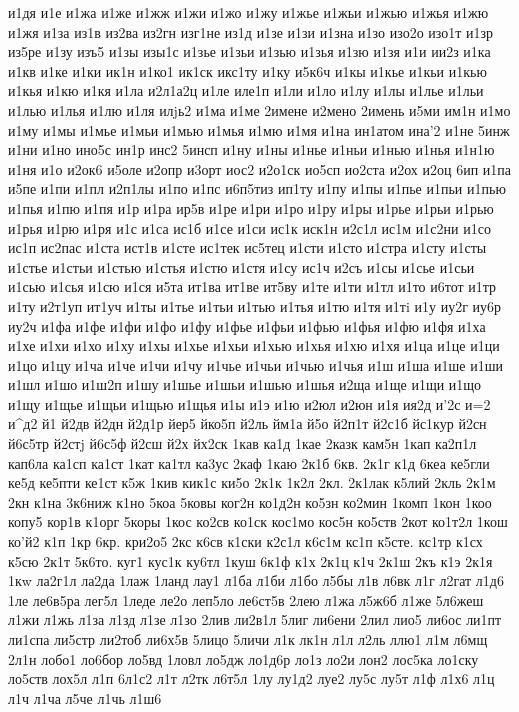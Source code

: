 {{и1дя
и1е
и1жа
и1же
и1жж
и1жи
и1жо
и1жу
и1жье
и1жьи
и1жью
и1жья
и1жю
и1жя
и1за
из1в
из2ва
из2гн
изг1не
из1д
и1зе
и1зи
и1зна
и1зо
изо2о
изо1т
и1зр
из5ре
и1зу
изъ5
и1зы
изы1с
и1зье
и1зьи
и1зью
и1зья
и1зю
и1зя
и1и
ии2з
и1ка
и1кв
и1ке
и1ки
ик1н
и1ко1
ик1ск
икс1ту
и1ку
и5к6ч
и1кы
и1кье
и1кьи
и1кью
и1кья
и1кю
и1кя
и1ла
и2л1а2ц
и1ле
иле1п
и1ли
и1ло
и1лу
и1лы
и1лье
и1льи
и1лью
и1лья
и1лю
и1ля
илjь2
и1ма
и1ме
2имене
и2мено
2имень
и5ми
им1н
и1мо
и1му
и1мы
и1мье
и1мьи
и1мью
и1мья
и1мю
и1мя
и1на
ин1атом
ина'2
и1не
5инж
и1ни
и1но
ино5с
ин1р
инс2
5инсп
и1ну
и1ны
и1нье
и1ньи
и1нью
и1нья
и1н1ю
и1ня
и1о
и2ок6
и5оле
и2опр
и3орт
иос2
и2о1ск
ио5сп
ио2ста
и2ох
и2оц
6ип
и1па
и5пе
и1пи
и1пл
и2п1лы
и1по
и1пс
и6п5тиз
ип1ту
и1пу
и1пы
и1пье
и1пьи
и1пью
и1пья
и1пю
и1пя
и1р
и1ра
ир5в
и1ре
и1ри
и1ро
и1ру
и1ры
и1рье
и1рьи
и1рью
и1рья
и1рю
и1ря
и1с
и1са
ис1б
и1се
и1си
ис1к
иск1н
и2с1л
ис1м
и1с2ни
и1со
ис1п
ис2пас
и1ста
ист1в
и1сте
ис1тек
ис5тец
и1сти
и1сто
и1стра
и1сту
и1сты
и1стье
и1стьи
и1стью
и1стья
и1стю
и1стя
и1су
ис1ч
и2съ
и1сы
и1сье
и1сьи
и1сью
и1сья
и1сю
и1ся
и5та
ит1ва
ит1ве
ит5ву
и1те
и1ти
и1тл
и1то
и6тот
и1тр
и1ту
и2т1уп
ит1уч
и1ты
и1тье
и1тьи
и1тью
и1тья
и1тю
и1тя
и1тi
и1у
иу2г
иу6р
иу2ч
и1фа
и1фе
и1фи
и1фо
и1фу
и1фье
и1фьи
и1фью
и1фья
и1фю
и1фя
и1ха
и1хе
и1хи
и1хо
и1ху
и1хы
и1хье
и1хьи
и1хью
и1хья
и1хю
и1хя
и1ца
и1це
и1ци
и1цо
и1цу
и1ча
и1че
и1чи
и1чу
и1чье
и1чьи
и1чью
и1чья
и1ш
и1ша
и1ше
и1ши
и1шл
и1шо
и1ш2п
и1шу
и1шье
и1шьи
и1шью
и1шья
и2ща
и1ще
и1щи
и1що
и1щу
и1щье
и1щьи
и1щью
и1щья
и1ы
и1э
и1ю
и2юл
и2юн
и1я
ия2д
и'2с
и=2
и^д2
й1
й2дв
й2дн
й2д1р
йер5
йко5п
й2ль
йм1а
й5о
й2п1т
й2с1б
йс1кур
й2сн
й6с5тр
й2стj
й6с5ф
й2сш
й2х
йх2ск
1кав
ка1д
1кае
2казк
кам5н
1кап
ка2п1л
кап6ла
ка1сп
ка1ст
1кат
ка1тл
ка3ус
2каф
1каю
2к1б
6кв.
2к1г
к1д
6кеа
ке5гли
ке5д
ке5пти
ке1ст
к5ж
1кив
кик1с
ки5о
2к1к
1к2л
2кл.
2к1лак
к5лий
2кль
2к1м
2кн
к1на
3к6ниж
к1но
5коа
5ковы
ког2н
ко1д2н
ко5зн
ко2мин
1комп
1кон
1коо
копу5
кор1в
к1орг
5коры
1кос
ко2св
ко1ск
кос1мо
кос5н
ко5ств
2кот
ко1т2л
1кош
ко'й2
к1п
1кр
6кр.
кри2о5
2кс
к6св
к1ски
к2с1л
к6с1м
кс1п
к5сте.
кс1тр
к1сх
к5сю
2к1т
5к6то.
куг1
кус1к
ку6тл
1куш
6к1ф
к1х
2к1ц
к1ч
2к1ш
2къ
к1э
2к1я
1кw
ла2г1л
ла2да
1лаж
1ланд
лау1
л1ба
л1би
л1бо
л5бы
л1в
л6вк
л1г
л2гат
л1д6
1ле
ле6в5ра
лег5л
1леде
ле2о
леп5ло
ле6ст5в
2лею
л1жа
л5ж6б
л1же
5л6жеш
л1жи
л1жь
л1за
л1зд
л1зе
л1зо
2лив
ли2в1л
5лиг
ли6ени
2лил
лио5
ли6ос
ли1пт
ли1спа
ли5стр
ли2тоб
ли6х5в
5лицо
5личи
л1к
лк1н
л1л
л2ль
ллю1
л1м
л6мщ
2л1н
лобо1
ло6бор
ло5вд
1ловл
ло5дж
ло1д6р
ло1з
ло2и
лон2
лос5ка
ло1ску
ло5ств
лох5л
л1п
6л1с2
л1т
л2тк
л6т5л
1лу
лу1д2
луе2
лу5с
лу5т
л1ф
л1х6
л1ц
л1ч
л1ча
л5че
л1чь
л1ш6
}}
